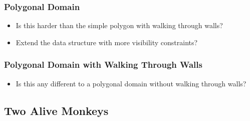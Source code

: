 \documentclass{article}
\begin{document}
\subsubsection{Polygonal Domain}
\begin{itemize}
    \item Is this harder than the simple polygon with walking through walls?
    \item Extend the data structure with more visibility constraints?
\end{itemize}


\subsubsection{Polygonal Domain with Walking Through Walls}
\begin{itemize}
    \item Is this any different to a polygonal domain without walking through walls?
\end{itemize}

\subsection{Two Alive Monkeys}
\end{document}
